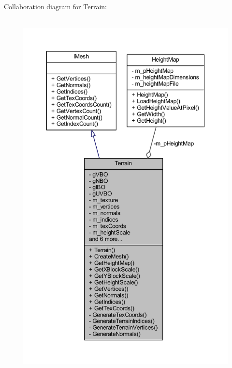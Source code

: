 Collaboration diagram for Terrain\+:\nopagebreak
\begin{figure}[H]
\begin{center}
\leavevmode
\includegraphics[height=550pt]{class_terrain__coll__graph}
\end{center}
\end{figure}
